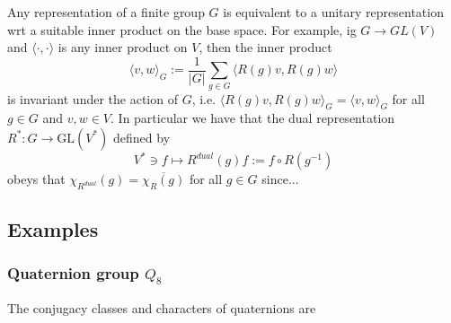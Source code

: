 \begin{theorem}
%
Any representation of a finite group $G$ is equivalent to a unitary representation wrt a suitable inner product on the base space.
For example, ig $G\to GL(V)$ and $\langle\cdot,\cdot\rangle$ is any inner product on $V$, then the inner product
\begin{equation*}
\langle v, w\rangle_{G}:=\frac{1}{|G|} \sum_{g \in G}\langle R(g) v, R(g) w\rangle
\end{equation*}
is invariant under the action of $G$, i.e. $\langle R(g) v, R(g) w\rangle_{G}=\langle v, w\rangle_{G}$ for all $g \in G$ and $v, w \in V$.
%
In particular we have that the dual representation $R^{*}: G \rightarrow \mathrm{GL}\left(V^{*}\right)$ defined by
\begin{equation*}
V^*\ni f\mapsto R^{dual}(g)f:=f\circ R\left(g^{-1}\right)
\end{equation*}
obeys that $\chi_{R^{dual}}(g)=\overline{\chi_{R}(g)}$ for all $g \in G$ since...
\end{theorem}



\subsection{Examples}

\subsubsection*{Quaternion group $Q_{8}$}

The conjugacy classes and characters of quaternions are


